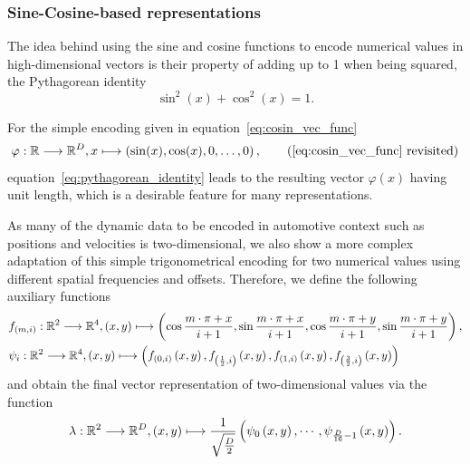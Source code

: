 \subsubsection{Sine-Cosine-based representations}%
\label{ssubsec:sine_cosine_based_representations}

The idea behind using the sine and cosine functions to encode numerical values in high-dimensional vectors is their property of adding up to \num{1} when being squared, the Pythagorean identity
\begin{equation}
\label{eq:pythagorean_identity}
\sin^{2}(x) + \cos^{2}(x) = 1.
\end{equation}

For the simple encoding given in equation~\eqref{eq:cosin_vec_func} 
\begin{equation}
\abb{\varphi}{\mathbb{R}}{\mathbb{R}^{D}}{x}{\left(\sin(x), \cos(x), 0, \ldots, 0\right)},
\tag{\eqref{eq:cosin_vec_func} revisited}
\end{equation}
equation~\eqref{eq:pythagorean_identity} leads to the resulting vector $\varphi(x)$ having unit length, which is a desirable feature for many representations.

As many of the dynamic data to be encoded in automotive context such as positions and velocities is two-dimensional, we also show a more complex adaptation of this simple trigonometrical encoding for two numerical values using different spatial frequencies and offsets.
Therefore, we define the following auxiliary functions
\begin{align}
    &f_{\left(m,i\right)}: \mathbb{R}^2 \longrightarrow \mathbb{R}^4, \left(x,y\right) \longmapsto \left(\cos\frac{m\cdot \pi + x}{i + 1}, \sin\frac{m\cdot \pi + x}{i + 1}, \cos\frac{m\cdot \pi + y}{i + 1}, \sin\frac{m\cdot \pi + y}{i + 1}\right), \label{eq:cos_aux_1} \\
    &\psi_i: \mathbb{R}^2 \longrightarrow \mathbb{R}^4, \left(x,y\right) \longmapsto \left(f_{\left(0,i\right)}\left(x,y\right), f_{\left(\frac{1}{2},i\right)}\left(x,y\right), f_{\left(1,i\right)}\left(x,y\right), f_{\left(\frac{3}{2},i\right)}\left(x,y\right)\right) \label{eq:cos_aux_2}
\end{align}
and obtain the final vector representation of two-dimensional values via the function 
\begin{equation}
\label{eq:cosin_2d_enc}
\lambda: \mathbb{R}^2 \longrightarrow \mathbb{R}^D, \left(x,y\right) \longmapsto \frac{1}{\sqrt{\frac{D}{2}}}\left(\psi_0\left(x,y\right), \cdots, \psi_{\frac{D}{16}-1}\left(x,y\right)\right).
\end{equation}

